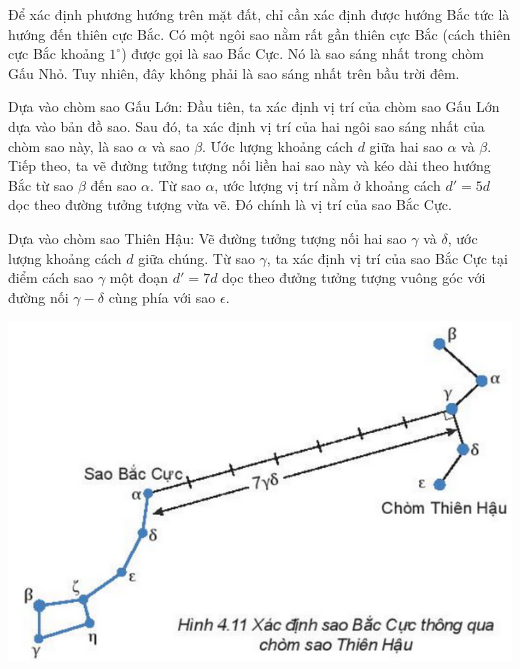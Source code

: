 Để xác định phương hướng trên mặt đất, chỉ cần xác định được hướng Bắc tức là hướng đến thiên cực Bắc. Có một ngôi sao nằm rất gần thiên cực Bắc (cách thiên cực Bắc khoảng $1^\circ$) được gọi là sao Bắc Cực. Nó là sao sáng nhất trong chòm Gấu Nhỏ. Tuy nhiên, đây không phải là sao sáng nhất trên bầu trời đêm.

\begin{minipage}[l]{0.6\textwidth}
	Dựa vào chòm sao Gấu Lớn: Đầu tiên, ta xác định vị trí của chòm sao Gấu Lớn dựa vào bản đồ sao. Sau đó, ta xác định vị trí của hai ngôi sao sáng nhất của chòm sao này, là sao $\alpha$ và sao $\beta$. Ước lượng khoảng cách $d$ giữa hai sao $\alpha$ và $\beta$. Tiếp theo, ta vẽ đường tưởng tượng nối liền hai sao này và kéo dài theo hướng Bắc từ sao $\beta$ đến sao $\alpha$. Từ sao $\alpha$, ước lượng vị trí nằm ở khoảng cách $d'=5d$ dọc theo đường tưởng tượng vừa vẽ. Đó chính là vị trí của sao Bắc Cực.
	
	Dựa vào chòm sao Thiên Hậu: Vẽ đường tưởng tượng nối hai sao $\gamma$ và $\delta$, ước lượng khoảng cách $d$ giữa chúng. Từ sao $\gamma$, ta xác định vị trí của sao Bắc Cực tại điểm cách sao $\gamma$ một đoạn $d'=7d$ dọc theo đưởng tưởng tượng vuông góc với đường nối $\gamma - \delta$ cùng phía với sao $\epsilon$.
\end{minipage}
\begin{minipage}[r]{0.4\textwidth}
	\begin{center}
		\includegraphics[scale=0.5]{../figs/G10-033-3.png}
	\end{center}
\end{minipage}


